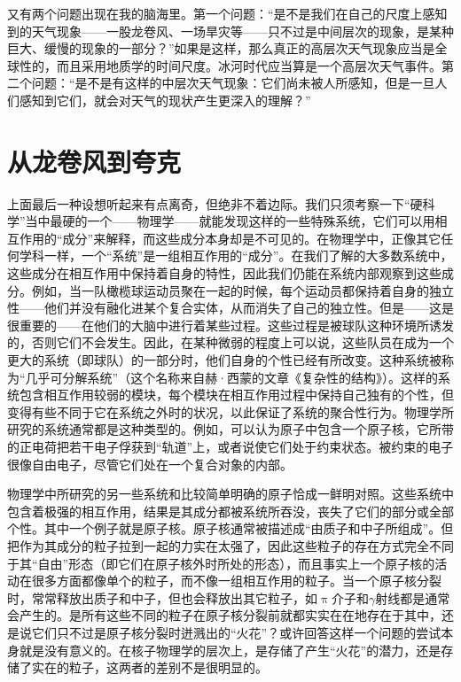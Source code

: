 又有两个问题出现在我的脑海里。第一个问题：“是不是我们在自己的尺度上感知到的天气现象——一股龙卷风、一场旱灾等——只不过是中间层次的现象，是某种巨大、缓慢的现象的一部分？”如果是这样，那么真正的高层次天气现象应当是全球性的，而且采用地质学的时间尺度。冰河时代应当算是一个高层次天气事件。第二个问题：“是不是有这样的中层次天气现象：它们尚未被人所感知，但是一旦人们感知到它们，就会对天气的现状产生更深入的理解？”

\section{从龙卷风到夸克}

上面最后一种设想听起来有点离奇，但绝非不着边际。我们只须考察一下“硬科学”当中最硬的一个——物理学——就能发现这样的一些特殊系统，它们可以用相互作用的“成分”来解释，而这些成分本身却是不可见的。在物理学中，正像其它任何学科一样，一个“系统”是一组相互作用的“成分”。在我们了解的大多数系统中，这些成分在相互作用中保持着自身的特性，因此我们仍能在系统内部观察到这些成分。例如，当一队橄榄球运动员聚在一起的时候，每个运动员都保持着自身的独立性——他们并没有融化进某个复合实体，从而消失了自己的独立性。但是——这是很重要的——在他们的大脑中进行着某些过程。这些过程是被球队这种环境所诱发的，否则它们不会发生。因此，在某种微弱的程度上可以说，这些队员在成为一个更大的系统（即球队）的一部分时，他们自身的个性已经有所改变。这种系统被称为“几乎可分解系统”（这个名称来自赫·西蒙的文章《复杂性的结构》）。这样的系统包含相互作用较弱的模块，每个模块在相互作用过程中保持自己独有的个性，但变得有些不同于它在系统之外时的状况，以此保证了系统的聚合性行为。物理学所研究的系统通常都是这种类型的。例如，可以认为原子中包含一个原子核，它所带的正电荷把若干电子俘获到“轨道”上，或者说使它们处于约束状态。被约束的电子很像自由电子，尽管它们处在一个复合对象的内部。

物理学中所研究的另一些系统和比较简单明确的原子恰成一鲜明对照。这些系统中包含着极强的相互作用，结果是其成分都被系统所吞没，丧失了它们的部分或全部个性。其中一个例子就是原子核。原子核通常被描述成“由质子和中子所组成”。但把作为其成分的粒子拉到一起的力实在太强了，因此这些粒子的存在方式完全不同于其“自由”形态（即它们在原子核外时所处的形态），而且事实上一个原子核的活动在很多方面都像单个的粒子，而不像一组相互作用的粒子。当一个原子核分裂时，常常释放出质子和中子，但也会释放出其它粒子，如$\uppi$介子和$\gamma$射线都是通常会产生的。是所有这些不同的粒子在原子核分裂前就都实实在在地存在于其中，还是说它们只不过是原子核分裂时迸溅出的“火花”？或许回答这样一个问题的尝试本身就是没有意义的。在核子物理学的层次上，是存储了产生“火花”的潜力，还是存储了实在的粒子，这两者的差别不是很明显的。

